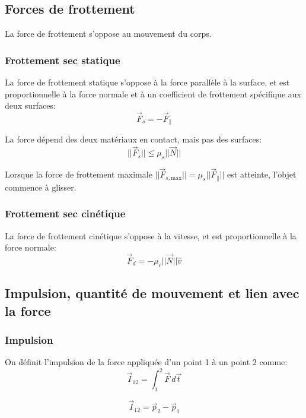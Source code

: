 \documentclass{article}
\numberwithin{equation}{section}
\begin{document}
\subsection{Forces de frottement}
La force de frottement s'oppose au mouvement du corps.

\subsubsection{Frottement sec statique}
La force de frottement statique s'oppose à la force parallèle à la surface, et est proportionnelle à la force normale et à un coefficient de frottement spécifique aux deux surfaces:
\begin{equation*}
	\vec F_s = - \vec F_\parallel
\end{equation*}

La force dépend des deux matériaux en contact, mais pas des surfaces:
\begin{equation}
	\boxed{ ||\vec F_s|| \leq \mu_s||\vec N|| }
\end{equation}

Lorsque la force de frottement maximale \( || \vec F_{s, \text{max}} || = \mu_s || \vec F_\parallel ||\) est atteinte, l'objet commence à glisser. 

\subsubsection{Frottement sec cinétique}
La force de frottement cinétique s'oppose à la vitesse, et est proportionnelle à la force normale:
\begin{equation}
	\boxed{ \vec F_d = - \mu_c ||\vec N|| \hat v }
\end{equation}

\subsection{Impulsion, quantité de mouvement et lien avec la force}

\subsubsection{Impulsion}
On définit l'impulsion de la force appliquée d'un point 1 à un point 2 comme:
\begin{equation}
	\boxed{ \vec I_{12} = \int_1^2 \vec F \, d \vec t }
\end{equation}

\begin{equation}
	\boxed{ \vec I_{12} = \vec p_2 - \vec p_1 }
\end{equation}
\end{document}
